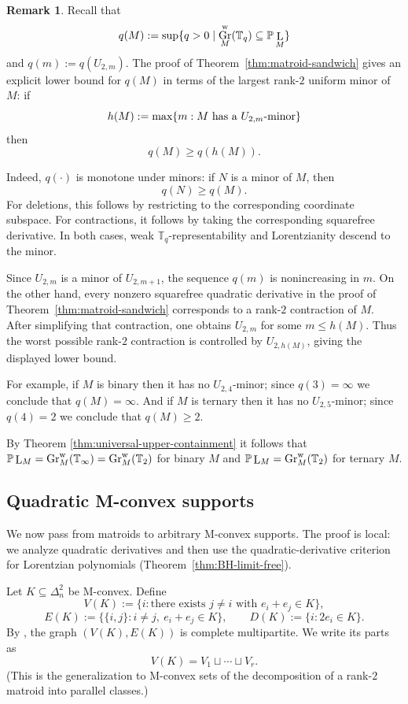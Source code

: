 \documentclass[12pt]{amsart}
\theoremstyle{definition}
\newtheorem{remark}[theorem]{Remark}
\newcommand{\1}{\mathbf{1}}
\DeclareMathOperator{\upL}{L}   %
\DeclareMathOperator{\Gr}{Gr}
\renewcommand\P{{\mathbb P}}
\newcommand\T{{\mathbb T}}
\renewcommand\max{\textup{max}}
\renewcommand\geq{\geqslant}
\newcommand\mb{\texorpdfstring{\textbf{Matt:} }{Matt: }}
\newcommand{\mk}[2][]{\todo[color=orange, #1]{\textbf{Mario}: #2}}
\begin{document}
\begin{remark}
Recall that 
\[
q(M):=\sup\{q>0 \mid \Gr^{\rm w}_M(\T_q)\subseteq \P\upL_M\}
\]
and $q(m) := q(U_{2,m})$.
The proof of Theorem~\ref{thm:matroid-sandwich} gives an explicit lower bound for $q(M)$ in terms of the largest rank-$2$
uniform minor of $M$: if  
\[
h(M):=\max\{m:\text{$M$ has a $U_{2,m}$-minor}\}
\]
then
\[
q(M)\ge q(h(M)).
\]

Indeed, $q(\cdot)$ is monotone under minors: if $N$ is a minor of $M$, then
\[
q(N)\ge q(M).
\]
For deletions, this follows by restricting to the corresponding coordinate
subspace.  For contractions, it follows by taking the corresponding squarefree
derivative.  In both cases, weak $\T_q$-representability and Lorentzianity
descend to the minor.

Since $U_{2,m}$ is a minor of $U_{2,m+1}$, the sequence $q(m)$ is
nonincreasing in $m$.  On the other hand, every nonzero squarefree quadratic
derivative in the proof of Theorem~\ref{thm:matroid-sandwich} corresponds to a rank-$2$ contraction of $M$.  After
simplifying that contraction, one obtains $U_{2,m}$ for some $m\le h(M)$.
Thus the worst possible rank-$2$ contraction is controlled by
$U_{2,h(M)}$, giving the displayed lower bound.

For example, if $M$ is binary then it has no $U_{2,4}$-minor; since $q(3)=\infty$ we conclude that $q(M) = \infty$.
And if $M$ is ternary then it has no $U_{2,5}$-minor; since $q(4)=2$ we conclude that $q(M) \geq 2$. 

By Theorem \ref{thm:universal-upper-containment} it follows that $\P\upL_M=\Gr^{\rm w}_M(\T_\infty)=\Gr^{\rm w}_M(\T_2)$ for binary $M$ and $\P\upL_M=\Gr^{\rm w}_M(\T_2)$ for ternary $M$.
\end{remark}


\subsection{Quadratic M-convex supports}
\label{subsec:general-from-matroids}

We now pass from matroids to arbitrary M-convex supports.  The proof is local:
we analyze quadratic derivatives and then use the quadratic-derivative
criterion for Lorentzian polynomials (Theorem~\ref{thm:BH-limit-free}).

Let $K\subseteq \Delta_n^2$ be M-convex.  Define
\[
V(K):=\{i:\text{there exists }j\ne i\text{ with }e_i+e_j\in K\},
\]
\[
E(K):=\{\{i,j\}:i\ne j,\ e_i+e_j\in K\},
\qquad
D(K):=\{i:2e_i\in K\}.
\]
By \cite[Lemma 4.5(2)]{BHKL1}, the graph
$(V(K),E(K))$ is complete multipartite.  We write its parts as
\[
V(K)=V_1\sqcup\cdots\sqcup V_r.
\]
(This is the generalization to M-convex sets of the decomposition of a
rank-$2$ matroid into parallel classes.)
\end{document}
